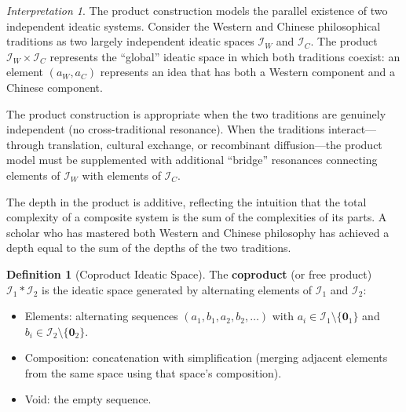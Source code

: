 \documentclass[11pt,openany]{book}
\theoremstyle{definition}
\newtheorem{definition}[axiom]{Definition}
\theoremstyle{plain}
\theoremstyle{remark}
\newtheorem{interpretation}[axiom]{Interpretation}
\newcommand{\IS}{\mathcal{I}}               %
\newcommand{\void}{\mathbf{0}}              %
\begin{document}
\begin{interpretation}
The product construction models the parallel existence of two independent ideatic systems. Consider the Western and Chinese philosophical traditions as two largely independent ideatic spaces $\IS_W$ and $\IS_C$. The product $\IS_W \times \IS_C$ represents the ``global'' ideatic space in which both traditions coexist: an element $(a_W, a_C)$ represents an idea that has both a Western component and a Chinese component.

The product construction is appropriate when the two traditions are genuinely independent (no cross-traditional resonance). When the traditions interact---through translation, cultural exchange, or recombinant diffusion---the product model must be supplemented with additional ``bridge'' resonances connecting elements of $\IS_W$ with elements of $\IS_C$.

The depth in the product is additive, reflecting the intuition that the total complexity of a composite system is the sum of the complexities of its parts. A scholar who has mastered both Western and Chinese philosophy has achieved a depth equal to the sum of the depths of the two traditions.
\end{interpretation}

\begin{definition}[Coproduct Ideatic Space]
The \textbf{coproduct} (or free product) $\IS_1 * \IS_2$ is the ideatic space generated by alternating elements of $\IS_1$ and $\IS_2$:
\begin{itemize}
\item Elements: alternating sequences $(a_1, b_1, a_2, b_2, \ldots)$ with $a_i \in \IS_1 \setminus \{\void_1\}$ and $b_i \in \IS_2 \setminus \{\void_2\}$.
\item Composition: concatenation with simplification (merging adjacent elements from the same space using that space's composition).
\item Void: the empty sequence.
\end{itemize}
\end{definition}
\end{document}
